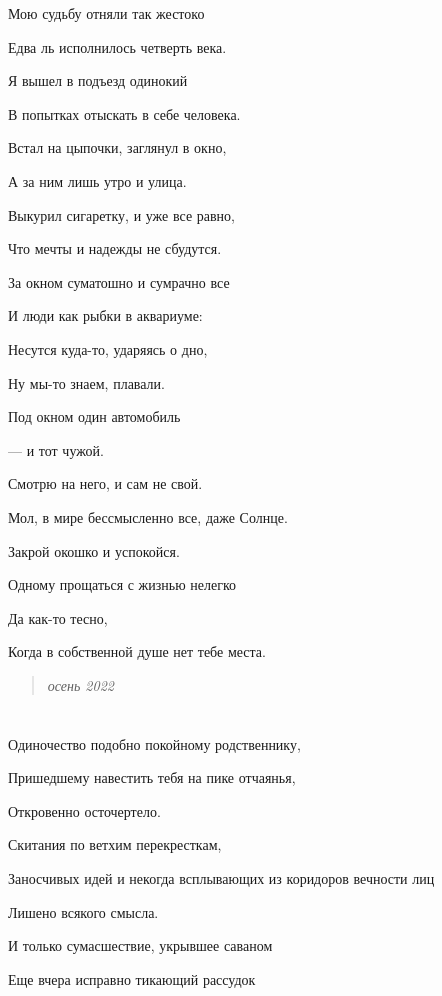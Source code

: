 \documentclass[
  a5paperpaper,
  DIV=11,
  numbers=noendperiod]{scrreprt}
\begin{document}

Мою судьбу отняли так жестоко

Едва ль исполнилось четверть века.

Я вышел в подъезд одинокий

В попытках отыскать в себе человека.

Встал на цыпочки, заглянул в окно,

А за ним лишь утро и улица.

Выкурил сигаретку, и уже все равно,

Что мечты и надежды не сбудутся.

За окном суматошно и сумрачно все

И люди как рыбки в аквариуме:

Несутся куда-то, ударяясь о дно,

Ну мы-то знаем, плавали.

Под окном один автомобиль

--- и тот чужой.

Смотрю на него, и сам не свой.

Мол, в мире бессмысленно все, даже Солнце.

Закрой окошко и успокойся.

Одному прощаться с жизнью нелегко

Да как-то тесно,

Когда в собственной душе нет тебе места.

\begin{quote}
\emph{осень 2022}
\end{quote}

\section*{}\label{section-14}

\markright{}

Одиночество подобно покойному родственнику,

Пришедшему навестить тебя на пике отчаянья,

Откровенно осточертело.

Скитания по ветхим перекресткам,

Заносчивых идей и некогда всплывающих из коридоров вечности лиц

Лишено всякого смысла.

И только сумасшествие, укрывшее саваном

Еще вчера исправно тикающий рассудок
\end{document}
